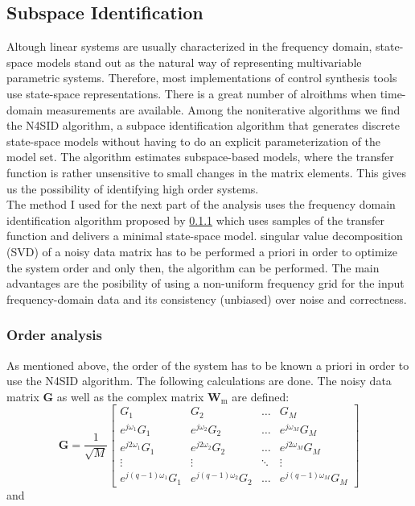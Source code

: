 \subsection{Subspace Identification}

Altough linear systems are usually characterized in the frequency domain, state-space models stand out as the natural way of representing multivariable parametric systems. Therefore, most implementations of control synthesis tools use state-space representations. There is a great number of alroithms when time-domain measurements are available. Among the noniterative algorithms we find the N4SID algorithm, a subpace identification algorithm that generates discrete state-space models without having to do an explicit parameterization of the model set. The algorithm estimates subspace-based models, where the transfer function is rather unsensitive to small changes in the matrix elements. This gives us the possibility of identifying high order systems. \\

The method I used for the next part of the analysis uses the frequency domain identification algorithm proposed by \ref{} which uses samples of the transfer function and delivers a minimal state-space model. singular value decomposition (SVD) of a noisy data matrix has to be performed a priori in order to optimize the system order and only then, the algorithm can be performed. The main advantages are the posibility of using a non-uniform frequency grid for the input frequency-domain data and its consistency (unbiased) over noise and correctness. 


\subsubsection{Order analysis}

As mentioned above, the order of the system has to be known a priori in order to use the N4SID algorithm. The following calculations are done. The noisy data matrix $\textbf{G}$ as well as the complex matrix $\textbf{W}_\text{m}$ are defined:
\[
\textbf{G} = \frac{1}{\sqrt{M}}
\begin{bmatrix}
G_1 & G_2 & \dots & G_M \\
e^{j\omega_1}G_1 & e^{j\omega_2}G_2 & \dots & e^{j\omega_M}G_M \\
e^{j2\omega_1}G_1 & e^{j2\omega_2}G_2 & \dots & e^{j2\omega_M}G_M \\
\vdots & \vdots & \ddots & \vdots \\
e^{j(q-1)\omega_1}G_1 &e^{j(q-1)\omega_2} G_2 & \dots & e^{j(q-1)\omega_M}G_M 
\end{bmatrix} \]
and

